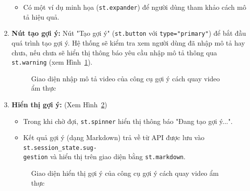 \begin{enumerate}
\begin{itemize}
        \item Có một ví dụ minh họa (\texttt{st.expander}) để người dùng tham khảo cách mô tả hiệu quả.
    \end{itemize}
    \item \textbf{Nút tạo gợi ý:} Nút "Tạo gợi ý" (\texttt{st.button} với \texttt{type="primary"}) để bắt đầu quá trình tạo gợi ý. Hệ thống sẽ kiểm tra xem người dùng đã nhập mô tả hay chưa, nếu chưa sẽ hiển thị thông báo yêu cầu nhập mô tả thông qua \texttt{st.warning} (xem Hình~\ref{fig:suggestion_input_description}).
    \begin{figure}[H]
        \centering
        \caption{Giao diện nhập mô tả video của công cụ gợi ý cách quay video ẩm thực}
        \label{fig:suggestion_input_description}
    \end{figure}

    \item \textbf{Hiển thị gợi ý:} (Xem Hình~\ref{fig:suggestion_result})
    \begin{itemize}
        \item Trong khi chờ đợi, \texttt{st.spinner} hiển thị thông báo "Đang tạo gợi ý...".

        \item Kết quả gợi ý (dạng Markdown) trả về từ API được lưu vào \texttt{st.session\_state.sug-\\gestion} và hiển thị trên giao diện bằng \texttt{st.markdown}.
    \end{itemize}
    \begin{figure}[H]
        \centering
        \caption{Giao diện hiển thị gợi ý của công cụ gợi ý cách quay video ẩm thực}
        \label{fig:suggestion_result}
    \end{figure}


\end{enumerate}
